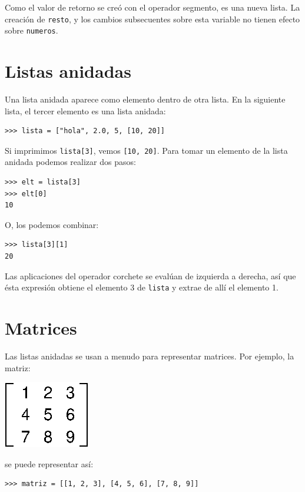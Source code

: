 Como el valor de retorno se creó con el operador segmento, es una
nueva lista. La creación de \texttt{resto}, y los cambios subsecuentes
sobre esta variable no tienen efecto sobre \texttt{numeros}.

\section{Listas anidadas}

\label{nested lists}  

Una lista anidada aparece como elemento dentro de otra lista. En la
siguiente lista, el tercer elemento es una lista anidada:
\begin{verbatim}
>>> lista = ["hola", 2.0, 5, [10, 20]]
\end{verbatim}

Si imprimimos \texttt{lista{[}3{]}}, vemos \texttt{{[}10, 20{]}}.
Para tomar un elemento de la lista anidada podemos realizar dos pasos:
\begin{verbatim}
>>> elt = lista[3]
>>> elt[0]
10
\end{verbatim}
 O, los podemos combinar:
\begin{verbatim}
>>> lista[3][1]
20
\end{verbatim}

Las aplicaciones del operador corchete se evalúan de izquierda a derecha,
así que ésta expresión obtiene el elemento 3 de \texttt{lista} y extrae
de allí el elemento 1.

\section{Matrices}

 

Las listas anidadas se usan a menudo para representar matrices. Por
ejemplo, la matriz:

\beforefig \centerline{\includegraphics{illustrations/matrix}}
\afterfig

se puede representar así:
\begin{verbatim}
>>> matriz = [[1, 2, 3], [4, 5, 6], [7, 8, 9]]
\end{verbatim}

